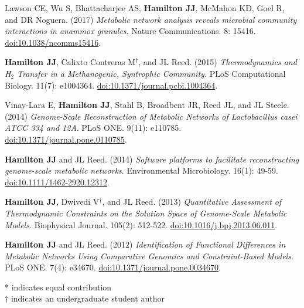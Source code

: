 \documentclass[letterpaper,11pt]{article}
\newlength{\outerbordwidth}
\newcommand{\resheading}[1]{\vspace{8pt}
  \parbox{\textwidth}{
  \setlength{\FrameSep}{\outerbordwidth}
\setlength{\fboxsep}{0pt}
\framebox[\textwidth][l]{\setlength{\fboxsep}{4pt}\fcolorbox{shadecolorB}{shadecolorB}{\textbf{\sffamily{\mbox{~}\makebox[6.262in][l]{\large #1} \vphantom{p\^{E}}}}}}
  }
  \vspace{-5pt}
}
\begin{document}
\begin{etaremune}[itemsep=-2pt]
	\item Lawson CE, Wu S, Bhattacharjee AS, \textbf{Hamilton JJ}, McMahon KD, Goel R, and DR Noguera. (2017) \emph{Metabolic network analysis reveals microbial community interactions in anammox granules}. Nature Communications. 8: 15416. \href{https://www.nature.com/articles/ncomms15416}{doi:10.1038/ncomms15416}.
	\item \textbf{Hamilton JJ}, Calixto Contreras M$^\dagger$, and JL Reed. (2015) \emph{Thermodynamics and H$_2$ Transfer in a Methanogenic, Syntrophic Community.} PLoS Computational Biology. 11(7): e1004364. \href{http://journals.plos.org/ploscompbiol/article?id=10.1371/journal.pcbi.1004364}{doi:10.1371/journal.pcbi.1004364}.
	\item Vinay-Lara E, \textbf{Hamilton JJ}, Stahl B, Broadbent JR, Reed JL, and JL Steele. (2014) \emph{Genome-Scale Reconstruction of Metabolic Networks of Lactobacillus casei ATCC 334 and 12A}. PLoS ONE. 9(11): e110785. \href{http://journals.plos.org/plosone/article?id=10.1371/journal.pone.0110785}{doi:10.1371/journal.pone.0110785}.
	\item \textbf{Hamilton JJ} and JL Reed. (2014) \emph{Software platforms to facilitate reconstructing genome-scale metabolic networks}. Environmental Microbiology. 16(1): 49-59. \href{http://onlinelibrary.wiley.com/doi/10.1111/1462-2920.12312/abstract}{doi:10.1111/1462-2920.12312}.
	\item \textbf{Hamilton JJ}, Dwivedi V$^\dagger$, and JL Reed. (2013) \emph{Quantitative Assessment of Thermodynamic Constraints on the Solution Space of Genome-Scale Metabolic Models.} Biophysical Journal. 105(2): 512-522. \href{http://www.cell.com/biophysj/abstract/S0006-3495%2813%2900685-1}{doi:10.1016/j.bpj.2013.06.011}.
	\item \textbf{Hamilton JJ} and JL Reed. (2012) \emph{Identification of Functional Differences in Metabolic Networks Using Comparative Genomics and Constraint-Based Models}. PLoS ONE. 7(4): e34670. \href{http://journals.plos.org/plosone/article?id=10.1371/journal.pone.0034670}{doi:10.1371/journal.pone.0034670}.
\end{etaremune}
* indicates equal contribution \\
$\dagger$ indicates an undergraduate student author

\end{document}
